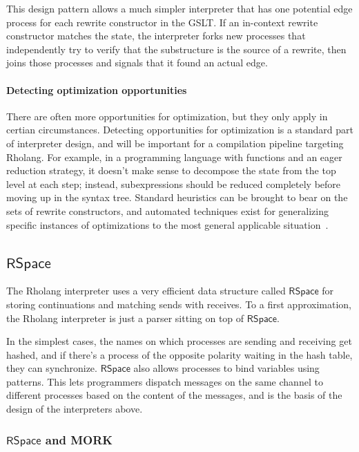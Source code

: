 \documentclass{article}
\newcommand{\RS}{\mathsf{RSpace}}
\begin{document}
This design pattern allows a much simpler interpreter that has one potential edge process for each rewrite constructor in the GSLT.  If an in-context rewrite constructor matches the state, the interpreter forks new processes that independently try to verify that the substructure is the source of a rewrite, then joins those processes and signals that it found an actual edge.

\paragraph{Detecting optimization opportunities}

There are often more opportunities for optimization, but they only apply in certian circumstances.  Detecting opportunities for optimization is a standard part of interpreter design, and will be important for a compilation pipeline targeting Rholang.  For example, in a programming language with functions and an eager reduction strategy, it doesn't make sense to decompose the state from the top level at each step; instead, subexpressions should be reduced completely before moving up in the syntax tree.  Standard heuristics can be brought to bear on the sets of rewrite constructors, and automated techniques exist for generalizing specific instances of optimizations to the most general applicable situation~\cite{Tate2010}.

\subsection{$\RS$}

The Rholang interpreter uses a very efficient data structure called $\RS$ for storing continuations and matching sends with receives.  To a first approximation, the Rholang interpreter is just a parser sitting on top of $\RS$.

In the simplest cases, the names on which processes are sending and receiving get hashed, and if there's a process of the opposite polarity waiting in the hash table, they can synchronize.  $\RS$ also allows processes to bind variables using patterns.  This lets programmers dispatch messages on the same channel to different processes based on the content of the messages, and is the basis of the design of the interpreters above.

\subsubsection{$\RS$ and MORK}
\end{document}
